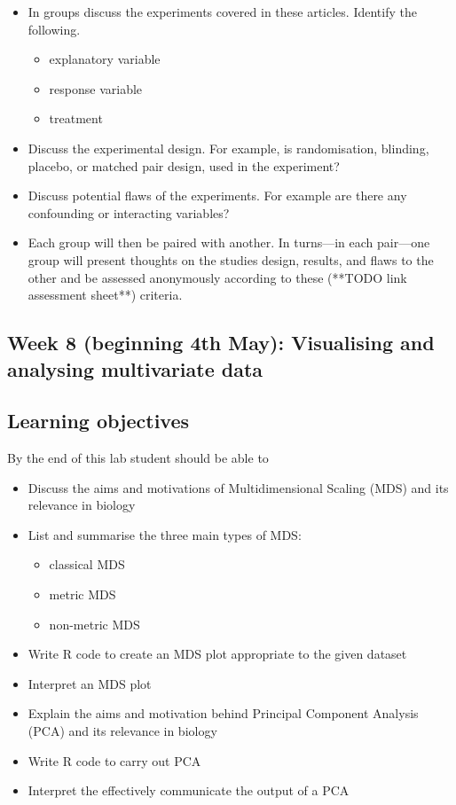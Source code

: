 \documentclass{article}
\begin{document}
\begin{itemize}
\item In groups discuss the experiments covered in these articles. Identify the following.
  \begin{itemize}
  \item explanatory variable
  \item response variable
  \item treatment 
  \end{itemize}
\item Discuss the experimental design. For example, is randomisation, blinding, placebo, or matched pair design, used in the experiment?
\item Discuss potential flaws of the experiments. For example are there any confounding or interacting variables?
  \item Each group will then be paired with another. In turns---in each pair---one group will present thoughts on the studies design, results, and flaws to the other and be assessed anonymously according to these (**TODO link assessment sheet**) criteria.
\end{itemize}


\newpage

\subsection*{Week 8 (beginning 4th May): Visualising and analysing multivariate data}
\subsection*{Learning objectives}
By the end of this lab student should be able to
\begin{itemize}
\item Discuss the aims and motivations of Multidimensional Scaling (MDS) and its relevance in biology
\item List and summarise the three main types of MDS:
  \begin{itemize}
  \item classical MDS
  \item metric MDS
  \item non-metric MDS
  \end{itemize}
\item Write R code to create an MDS plot appropriate to the given dataset
\item Interpret an MDS plot
\item Explain the aims and motivation behind Principal Component Analysis (PCA) and its relevance in biology 
\item Write R code to carry out PCA
  \item Interpret the effectively communicate the output of a PCA 
\end{itemize}
\end{document}
